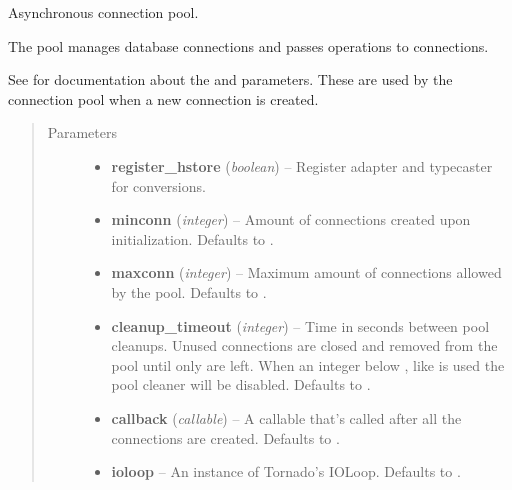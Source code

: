 \documentclass[letterpaper,10pt,english]{sphinxmanual}
\begin{document}
\begin{fulllineitems}
\label{api:momoko.Pool}
Asynchronous connection pool.

The pool manages database connections and passes operations to connections.

See {\hyperref[api:momoko.Connection]{}} for documentation about the  and
 parameters. These are used by the connection pool when
a new connection is created.
\begin{quote}\begin{description}
\item[{Parameters}] \leavevmode\begin{itemize}
\item {} 
\textbf{register\_hstore} (\emph{boolean}) -- Register adapter and typecaster for  conversions.

\item {} 
\textbf{minconn} (\emph{integer}) -- Amount of connections created upon initialization. Defaults to .

\item {} 
\textbf{maxconn} (\emph{integer}) -- Maximum amount of connections allowed by the pool. Defaults to .

\item {} 
\textbf{cleanup\_timeout} (\emph{integer}) -- Time in seconds between pool cleanups. Unused connections are closed and
removed from the pool until only  are left. When an integer
below , like  is used the pool cleaner will be disabled.
Defaults to .

\item {} 
\textbf{callback} (\emph{callable}) -- A callable that's called after all the connections are created. Defaults to .

\item {} 
\textbf{ioloop} -- An instance of Tornado's IOLoop. Defaults to .

\end{itemize}

\end{description}\end{quote}


\end{fulllineitems}
\end{document}
